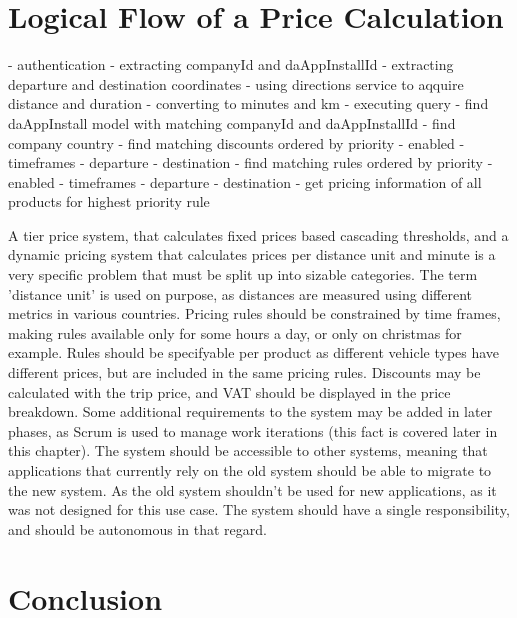 %
\section{Logical Flow of a Price Calculation}

- authentication
- extracting companyId and daAppInstallId
- extracting departure and destination coordinates
- using directions service to aqquire distance and duration
- converting to minutes and km
- executing query
- find daAppInstall model with matching companyId and daAppInstallId
- find company country
- find matching discounts ordered by priority
- enabled
- timeframes
- departure
- destination
- find matching rules ordered by priority
- enabled
- timeframes
- departure
- destination
- get pricing information of all products for highest priority rule

A tier price system, that calculates fixed prices based cascading thresholds, and a dynamic pricing system that calculates prices per distance unit and minute is a very specific problem that must be split up into sizable categories. The term 'distance unit' is used on purpose, as distances are measured using different metrics in various countries. Pricing rules should be constrained by time frames, making rules available only for some hours a day, or only on christmas for example. Rules should be specifyable per product as different vehicle types have different prices, but are included in the same pricing rules. Discounts may be calculated with the trip price, and VAT should be displayed in the price breakdown. Some additional requirements to the system may be added in later phases, as Scrum is used to manage work iterations (this fact is covered later in this chapter). The system should be accessible to other systems, meaning that applications that currently rely on the old system should be able to migrate to the new system. As the old system shouldn't be used for new applications, as it was not designed for this use case. The system should have a single responsibility, and should be autonomous in that regard.

%
\section{Conclusion}
